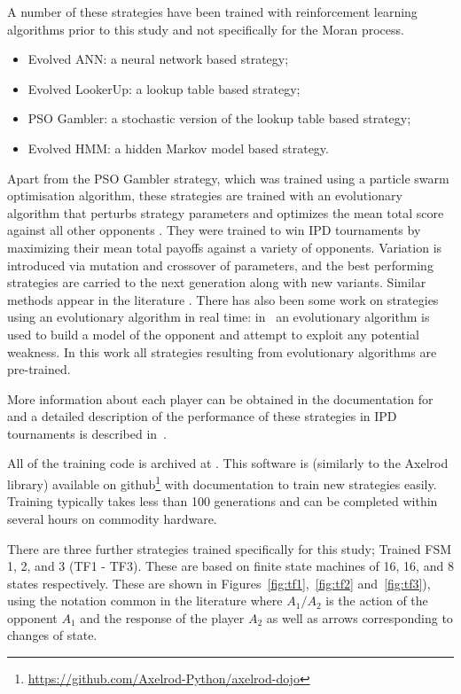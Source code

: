 \documentclass[10pt,journal]{IEEEtran}
\begin{document}
A number of these strategies have been trained with reinforcement learning
algorithms prior to this study and not specifically for the Moran process.

\begin{itemize}
    \item Evolved ANN: a neural network based strategy;
    \item Evolved LookerUp: a lookup table based strategy;
    \item PSO Gambler: a stochastic version of the lookup table based strategy;
    \item Evolved HMM: a hidden Markov model based strategy.
\end{itemize}

Apart from the PSO Gambler strategy, which was trained using a particle swarm
optimisation algorithm, these strategies are trained with an evolutionary
algorithm that perturbs strategy parameters and optimizes the mean total score
against all other opponents \cite{affenzeller2009genetic}. They were trained to
win IPD tournaments by maximizing their mean total payoffs against a variety
of opponents. Variation is
introduced via mutation and crossover of parameters, and the best performing
strategies are carried to the next generation along with new variants. Similar
methods appear in the literature \cite{Ashlock2006}.
There has also been some work on strategies using an evolutionary algorithm in real time: 
in~\cite{Gaudesi2016}
an evolutionary algorithm is used to build a model of the opponent and attempt
to exploit any potential weakness. In this work all strategies resulting from
evolutionary algorithms are pre-trained.

More information about each player can be obtained in the documentation for
\cite{axelrodproject} and a detailed description of the performance
of these strategies in IPD tournaments is described in~\cite{Harper2017}.

All of the training code is archived at \cite{marc_harper_2017_824264}. This
software is (similarly to the Axelrod library) available on
github\footnote{\url{https://github.com/Axelrod-Python/axelrod-dojo}}
with documentation to
train new strategies easily. Training
typically takes less than 100 generations and can be completed within several
hours on commodity hardware.

There are three further strategies trained specifically for this study; Trained
FSM 1, 2, and 3 (TF1 - TF3). These are based on finite state machines of 16, 16,
and 8 states respectively. These are shown in Figures~\ref{fig:tf1},~\ref{fig:tf2}
and~\ref{fig:tf3}), using the notation common in the literature where
\(A_1/A_2\) is the action of the opponent \(A_1\) and the response of the player
\(A_2\) as well as arrows corresponding to changes of state.
\end{document}

